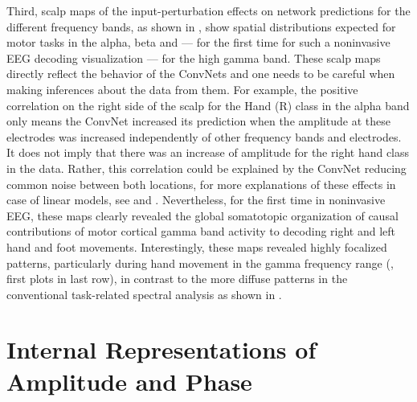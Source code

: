     Third, scalp maps of the input-perturbation effects on network
predictions for the different frequency bands, as shown in
, show spatial
distributions expected for motor tasks in the alpha, beta and --- for
the first time for such a noninvasive EEG decoding visualization --- for
the high gamma band. These scalp maps directly reflect the behavior of
the ConvNets and one needs to be careful when making inferences about
the data from them. For example, the positive correlation on the right
side of the scalp for the Hand (R) class in the alpha band only means
the ConvNet increased its prediction when the amplitude at these
electrodes was increased independently of other frequency bands and
electrodes. It does not imply that there was an increase of amplitude
for the right hand class in the data. Rather, this correlation could be
explained by the ConvNet reducing common noise between both locations,
for more explanations of these effects in case of linear models, see
 and
\cite{haufe_interpretation_2014}. Nevertheless, for the
first time in noninvasive EEG, these maps clearly revealed the global
somatotopic organization of causal contributions of motor cortical gamma
band activity to decoding right and left hand and foot movements.
Interestingly, these maps revealed highly focalized patterns,
particularly during hand movement in the gamma frequency range
(, first plots in last
row), in contrast to the more diffuse patterns in the conventional
task-related spectral analysis as shown in
.

\section{Internal Representations of Amplitude and
Phase}\label{internal-representations-of-amplitude-and-phase}

